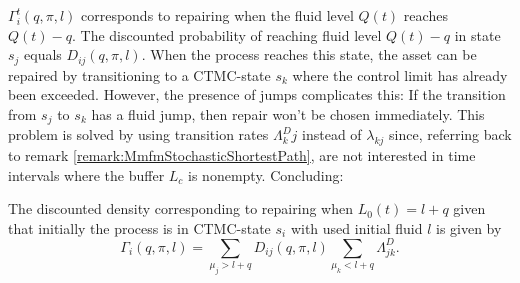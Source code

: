 $\Gamma_i^t(q,\pi,l)$ corresponds to repairing when the fluid level $Q(t)$ reaches $Q(t)-q$.
The discounted probability of reaching fluid level $Q(t)-q$ in state $s_j$ equals $D_{ij}(q, \pi,l)$.
When the process reaches this state, the asset can be repaired by transitioning to a CTMC-state $s_k$ where the control limit has already been exceeded.
However, the presence of jumps complicates this:
If the transition from $s_j$ to $s_k$ has a fluid jump, then repair won't be chosen immediately.
This problem is solved by using transition rates $\Lambda^D_kj$ instead of $\lambda_{kj}$ since, referring back to remark \ref{remark:MmfmStochasticShortestPath}, are not interested in time intervals where the buffer $L_c$ is nonempty.
Concluding:

\begin{theorem}
	The discounted density corresponding to repairing when $L_0(t)=l+q$ given that initially the process is in CTMC-state $s_i$ with used initial fluid $l$ is given by
	\[
	\Gamma_i(q,\pi,l)=\sum\limits_{\mu_j>l+q}D_{ij}(q,\pi,l)\sum\limits_{\mu_k<l+q}\Lambda_{jk}^D.
	\]
\end{theorem}


